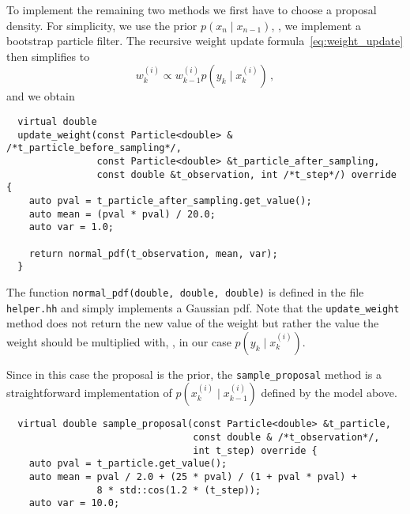 \begin{example}
  To implement the remaining two methods we first have to choose a
  proposal density. For simplicity, we use the prior
  $p(x_n \mid x_{n-1})$, \ie, we implement a bootstrap particle
  filter.  The recursive weight update
  formula~\eqref{eq:weight_update} then simplifies to
  \[
    w_k^{(i)} \propto w^{(i)}_{k-1} p(y_k \mid x_k^{(i)}) \,,
  \]
  and we obtain
\begin{verbatim}
  virtual double
  update_weight(const Particle<double> & /*t_particle_before_sampling*/,
                const Particle<double> &t_particle_after_sampling,
                const double &t_observation, int /*t_step*/) override {
    auto pval = t_particle_after_sampling.get_value();
    auto mean = (pval * pval) / 20.0;
    auto var = 1.0;

    return normal_pdf(t_observation, mean, var);
  }
\end{verbatim}
  The function \texttt{normal\_pdf(double, double, double)} is defined
  in the file \texttt{helper.hh} and simply implements a Gaussian pdf.
  Note that the \texttt{update\_weight} method does not return the new
  value of the weight but rather the value the weight should be
  multiplied with, \ie, in our case $p(y_k \mid x_k^{(i)})$.

  Since in this case the proposal is the prior, the
  \texttt{sample\_proposal} method is a straightforward implementation
  of $p(x_k^{(i)} \mid x_{k-1}^{(i)})$ defined by the model above.
\begin{verbatim}
  virtual double sample_proposal(const Particle<double> &t_particle,
                                 const double & /*t_observation*/,
                                 int t_step) override {
    auto pval = t_particle.get_value();
    auto mean = pval / 2.0 + (25 * pval) / (1 + pval * pval) +
                8 * std::cos(1.2 * (t_step));
    auto var = 10.0;


\end{verbatim}
\end{example}
